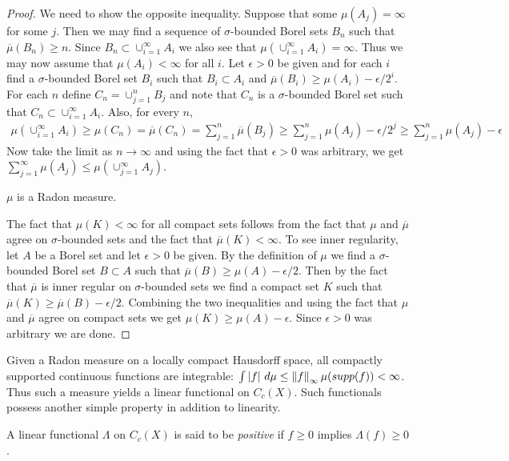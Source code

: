 \begin{proof}
We need to show the opposite inequality.  Suppose that some $\mu(A_j) = \infty$ for some $j$.  Then we may find
a sequence of $\sigma$-bounded Borel sets $B_n$ such that
$\overline{\mu}(B_n) \geq n$.  Since $B_n \subset \cup_{i=1}^\infty
A_i$ we also see that $\mu(\cup_{i=1}^\infty A_i) = \infty$.  Thus we
may now assume that $\mu(A_i) < \infty$ for all $i$.  Let $\epsilon >
0$ be given and for each $i$ find a $\sigma$-bounded Borel set $B_i$
such that $B_i \subset A_i$ and $\overline{\mu}(B_i) \geq \mu(A_i) -
\epsilon/2^i$.  For each $n$ define $C_n = \cup_{j=1}^n B_j$ and note
that $C_n$ is a $\sigma$-bounded Borel set such that $C_n \subset
\cup_{i=1}^\infty A_i$.  Also, for every $n$, 
\begin{align*}
\mu(\cup_{i=1}^\infty A_i) \geq \mu(C_n) = \overline{\mu}(C_n) =
\sum_{j=1}^n \overline{\mu}(B_j) \geq \sum_{j=1}^n \mu(A_j)  -
\epsilon/2^j \geq \sum_{j=1}^n \mu(A_j)  -\epsilon
\end{align*}
Now take the limit as $n \to \infty$ and using the fact that $\epsilon
> 0$ was arbitrary, we get $\sum_{j=1}^\infty \mu(A_j) \leq \mu(\cup_{j=1}^\infty A_j)$.

\begin{clm}$\mu$ is a Radon measure.
\end{clm}

The fact that $\mu(K) < \infty$ for all compact sets follows from the
fact that $\mu$ and $\overline{\mu}$ agree on $\sigma$-bounded sets
and the fact that $\overline{\mu}(K) < \infty$.  To see inner
regularity, let $A$ be a Borel set and let $\epsilon > 0$ be given.
By the definition of $\mu$ we find a $\sigma$-bounded Borel set $B
\subset A$ such that $\overline{\mu}(B) \geq \mu(A) - \epsilon/2$.  Then by
the fact that $\overline{\mu}$ is inner regular on $\sigma$-bounded
sets we find a compact set $K$ such that $\overline{\mu}(K) \geq
\overline{\mu}(B) - \epsilon/2$.  Combining the two inequalities and
using the fact that $\mu$ and $\overline{\mu}$ agree on compact sets
we get $\mu(K) \geq \mu(A) - \epsilon$.  Since $\epsilon > 0$ was
arbitrary we are done.
\end{proof}

Given a Radon measure on a locally compact Hausdorff space, all
compactly supported continuous functions are integrable: $\int \left \vert f \right \vert
\, d\mu \leq \left \lVert f \right \rVert_\infty \mu(supp(f)) < \infty$.  Thus such a
measure yields a linear functional on $C_c(X)$.  Such functionals
possess another simple property in addition to linearity.
\begin{defn}A linear functional $\Lambda$ on $C_c(X)$ is said to be
  \emph{positive} if $f \geq 0$ implies $\Lambda(f) \geq 0$.
\end{defn}

